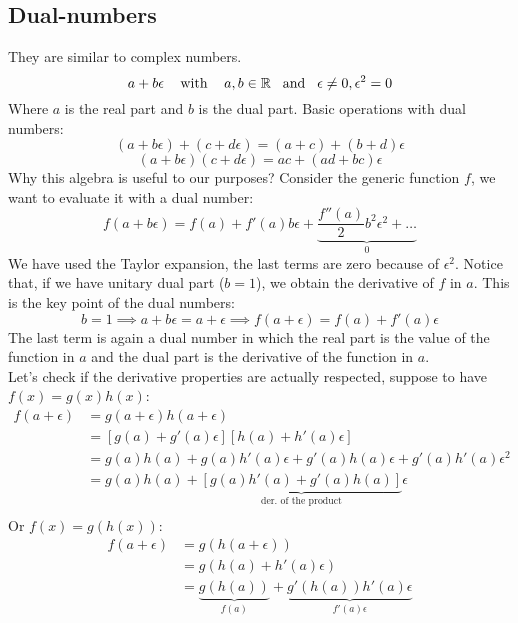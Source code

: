 \subsection*{Dual-numbers}
They are similar to complex numbers. 
\[
    a + b\epsilon \hspace{0.3cm} \text{ with }\hspace{0.3cm} a,b \in \mathbb{R} \hspace{0.3cm} \text{and} \hspace{0.3cm} \epsilon \neq 0, \epsilon^2 = 0    
\]
Where $a$ is the real part and $b$ is the dual part. Basic operations with dual numbers:
\[
    (a + b\epsilon) + (c + d\epsilon) = (a + c) + (b + d)\epsilon    
\]
\[
    (a + b\epsilon)(c + d\epsilon) = ac + (ad + bc)\epsilon     
\]
Why this algebra is useful to our purposes? Consider the generic function $f$, we want to evaluate it with a dual number:
\[
    f(a + b\epsilon) = f(a) + f'(a)b\epsilon + \underbrace{\dfrac{f''(a)}{2}b^2\epsilon^2   + \dots}_{0}
\]
We have used the Taylor expansion, the last terms are zero because of $\epsilon^2$. Notice that, if we have unitary dual part ($b = 1$), we obtain the derivative of $f$ in $a$. This is the key point of the dual numbers:
\[
    b=1 \implies a + b\epsilon = a + \epsilon \implies f(a + \epsilon) = f(a) + f'(a)\epsilon    
\]
The last term is again a dual number in which the real part is the value of the function in $a$ and the dual part is the derivative of the function in $a$.\\

Let's check if the derivative properties are actually respected, suppose to have $f(x) = g(x)h(x)$:
\[
    \begin{split}
        f(a + \epsilon) &= g(a + \epsilon)h(a + \epsilon)\\
        &= [g(a) + g'(a)\epsilon][h(a) + h'(a)\epsilon]\\
        &= g(a)h(a) + g(a)h'(a)\epsilon + g'(a)h(a)\epsilon + g'(a)h'(a)\epsilon^2\\
        &= g(a)h(a) + \underbrace{[g(a)h'(a) + g'(a)h(a)]}_{\text{der. of the product}}\epsilon\\
    \end{split}
\]
Or $f(x) = g(h(x))$:
\[
    \begin{split}
        f(a + \epsilon) &= g(h(a + \epsilon))\\
        &= g(h(a) + h'(a)\epsilon)\\
        &= \underbrace{ g(h(a))}_{f(a)} + \underbrace{g'(h(a))h'(a)\epsilon}_{f'(a)\epsilon}\\        
    \end{split}
\]


